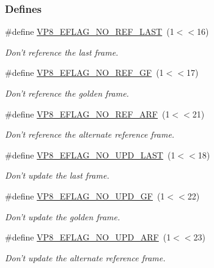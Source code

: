 \subsubsection*{\-Defines}
\begin{DoxyCompactItemize}
\item 
\#define \hyperlink{group__vp8__encoder_gafb51c67e5743275146bc1fc425727da3}{\-V\-P8\-\_\-\-E\-F\-L\-A\-G\-\_\-\-N\-O\-\_\-\-R\-E\-F\-\_\-\-L\-A\-S\-T}~(1$<$$<$16)
\begin{DoxyCompactList}\small\item\em \-Don't reference the last frame. \end{DoxyCompactList}\item 
\#define \hyperlink{group__vp8__encoder_gabb5e95343a2738abef44eca13059da33}{\-V\-P8\-\_\-\-E\-F\-L\-A\-G\-\_\-\-N\-O\-\_\-\-R\-E\-F\-\_\-\-G\-F}~(1$<$$<$17)
\begin{DoxyCompactList}\small\item\em \-Don't reference the golden frame. \end{DoxyCompactList}\item 
\#define \hyperlink{group__vp8__encoder_ga650ab0baea12be91082226a5cc18776a}{\-V\-P8\-\_\-\-E\-F\-L\-A\-G\-\_\-\-N\-O\-\_\-\-R\-E\-F\-\_\-\-A\-R\-F}~(1$<$$<$21)
\begin{DoxyCompactList}\small\item\em \-Don't reference the alternate reference frame. \end{DoxyCompactList}\item 
\#define \hyperlink{group__vp8__encoder_ga602edb6b02a89cb2db7a16d6dffba583}{\-V\-P8\-\_\-\-E\-F\-L\-A\-G\-\_\-\-N\-O\-\_\-\-U\-P\-D\-\_\-\-L\-A\-S\-T}~(1$<$$<$18)
\begin{DoxyCompactList}\small\item\em \-Don't update the last frame. \end{DoxyCompactList}\item 
\#define \hyperlink{group__vp8__encoder_gab01d066c5236457d345ce1cab4c41d6b}{\-V\-P8\-\_\-\-E\-F\-L\-A\-G\-\_\-\-N\-O\-\_\-\-U\-P\-D\-\_\-\-G\-F}~(1$<$$<$22)
\begin{DoxyCompactList}\small\item\em \-Don't update the golden frame. \end{DoxyCompactList}\item 
\#define \hyperlink{group__vp8__encoder_ga1cff46a5287e73a620660030d40b9e6c}{\-V\-P8\-\_\-\-E\-F\-L\-A\-G\-\_\-\-N\-O\-\_\-\-U\-P\-D\-\_\-\-A\-R\-F}~(1$<$$<$23)
\begin{DoxyCompactList}\small\item\em \-Don't update the alternate reference frame. \end{DoxyCompactList}\item 

\end{DoxyCompactItemize}
